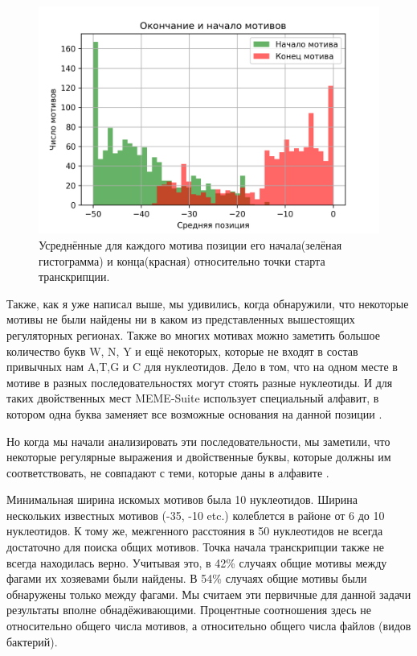 \documentclass[14pt]{extarticle}
\begin{document}
    \begin{figure}[h]
        \centering
        \includegraphics[width=\textwidth]{img/_plot_.png}
        \caption{Усреднённые для каждого мотива позиции его начала(зелёная гистограмма) и конца(красная) относительно точки старта транскрипции.}
        \label{fig:skybox}
    \end{figure}
    
    \par{Также, как я уже написал выше, мы удивились, когда обнаружили, что некоторые мотивы не были найдены ни в каком 
    из представленных вышестоящих регуляторных регионах. Также во многих мотивах 
    можно заметить большое количество букв W, N, Y и ещё некоторых, которые не входят в состав привычных нам A,T,G и C 
    для нуклеотидов. Дело в том, что на одном месте в мотиве в разных последовательностях могут стоять разные 
    нуклеотиды. И для таких двойственных мест MEME-Suite использует специальный алфавит, в котором одна буква заменяет 
    все возможные основания на данной позиции \cite{memealphabet}. }
    
    \par{Но когда мы начали анализировать эти последовательности, мы заметили, что некоторые регулярные выражения и 
    двойственные буквы, которые должны им соответствовать, не совпадают с теми, которые даны в алфавите 
    \cite{memealphabet}.}
    
    \par{ Минимальная ширина искомых мотивов была 10 нуклеотидов. Ширина нескольких известных 
    мотивов (-35, -10 etc.) колеблется в районе от 6 до 10 нуклеотидов. К тому же, межгенного расстояния в 
    50 нуклеотидов не всегда достаточно для поиска общих мотивов. Точка начала транскрипции также не всегда находилась верно. Учитывая это, в 42\% случаях общие мотивы между фагами
    их хозяевами были найдены. В 54\% случаях общие мотивы были обнаружены только между фагами. Мы считаем эти первичные
    для данной задачи результаты вполне обнадёживающими. Процентные соотношения здесь не относительно общего числа 
    мотивов, а относительно общего числа файлов (видов бактерий).}
    
\end{document}
